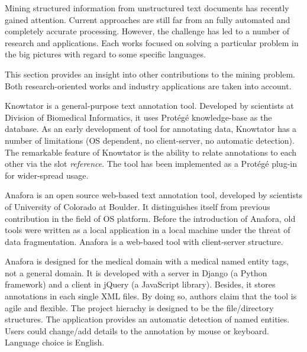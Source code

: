 
Mining structured information from unstructured text documents has recently gained attention. Current approaches are still 
far from an fully automated and completely accurate processing. However, the challenge has led to a number of research and 
applications. Each works focused on solving a particular problem in the big pictures with regard to some specific languages. 

This section provides an insight into other contributions to the mining problem. Both research-oriented works and 
industry applications are taken into account.

Knowtator is a general-purpose text annotation tool. Developed by scientists at Division of Biomedical Informatics, 
it uses Protégé knowledge-base as the database. As an early development of tool for annotating data, Knowtator has 
a number of limitations (OS dependent, no client-server, no automatic detection). The remarkable feature of Knowtator
is the ability to relate annotations to each other via the slot \textit{reference}.  The tool has been implemented as
a Protégé plug-in for wider-spread usage.



Anafora is an open source web-based text annotation tool, developed by scientists of  University of Colorado at Boulder. It 
distinguishes itself from previous contribution in the field of OS platform. Before the introduction of Anafora, old tools 
were written as a local application in a local machine under the threat of data fragmentation. Anafora is a web-based tool 
with client-server structure. %


Anafora is designed for the medical domain with a medical named entity tags, not a general domain. It is developed with a server in Django (a Python framework) and a client in jQuery (a JavaScript 
library). Besides, it stores annotations in each single XML files. By doing so, authors claim that the tool is agile and 
flexible. The project hierachy is designed to be the file/directory structures. The application provides an automatic detection
of named entities. Users could change/add details to the annotation by mouse or keyboard. Language choice is English.


